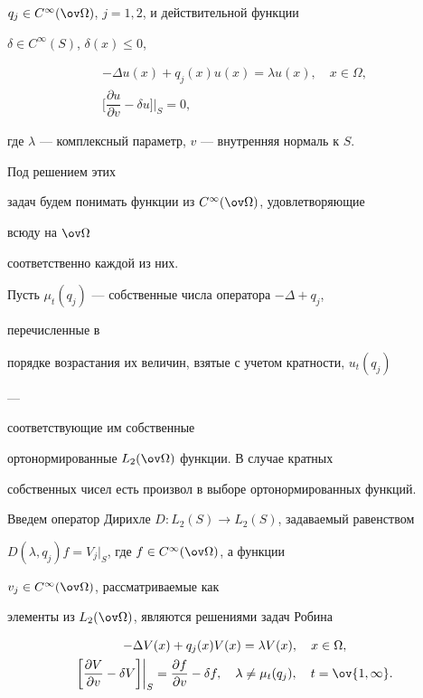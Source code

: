 $q_j\in C^\infty(\ov\Omega)$, $j=1,2$, и действительной функции 


$\delta\in C^\infty(S)$, $\delta(x)\le0$, 


\begin{equation} 


\begin{array}{c} 


-\Delta u(x)+q_j(x)u(x)=\lambda u(x),\quad x\in\Omega,\\[3mm] 


\displaystyle\bigg[\dfrac{\partial u}{\partial v}-\delta u 


\displaystyle\bigg]\bigg|_S=0, 


\end{array}


\end{equation} 


где $\lambda$ --- комплексный параметр, $v$ --- внутренняя нормаль к $S$. 


Под решением этих 


задач будем понимать функции из $C^\infty(\ov\Omega)$, удовлетворяющие 


всюду на $\ov\Omega$ 


соответственно каждой из них. 


 


Пусть $\mu_t(q_j)$ --- собственные числа оператора $-\Delta+q_j$, 


перечисленные в 


порядке возрастания их величин, взятые с учетом кратности, $u_t(q_j)$


--- 


соответствующие им собственные 


ортонормированные $L_2(\ov\Omega)$ функции. В случае кратных 


собственных чисел есть произвол в выборе ортонормированных функций. 


Введем оператор Дирихле $D:L_2(S)\to L_2(S)$, задаваемый равенством 


$D(\lambda,q_j)f=V_j|_S$, где $f\in C^\infty(\ov\Omega)$, а функции 


$v_j\in C^\infty(\ov\Omega)$, рассматриваемые как 


элементы из $L_2(\ov\Omega)$, являются решениями задач Робина


\begin{gather*} 


-\Delta V(x)+q_j(x)V(x)=\lambda V(x),\quad x\in\Omega,\\ 


\bigg[\frac{\partial V}{\partial v}-\delta V\bigg]\bigg|_S= 


\frac{\partial f}{\partial v}-\delta f,\quad 


\lambda\ne\mu_t(q_j),\quad t=\ov{1,\infty}. 


\end{gather*} 


